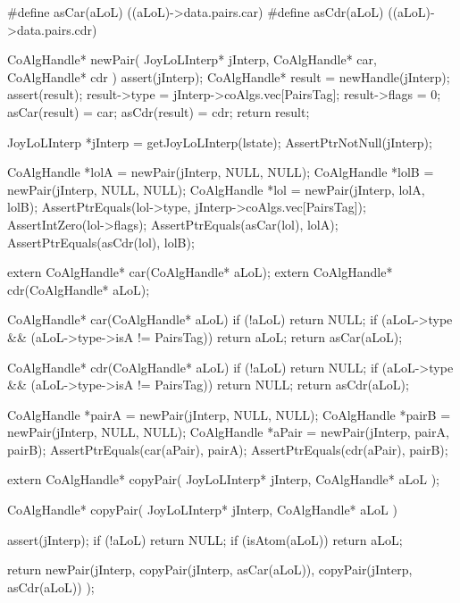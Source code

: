 #define asCar(aLoL) ((aLoL)->data.pairs.car)
#define asCdr(aLoL) ((aLoL)->data.pairs.cdr)
\stopCHeader

\startCCode
CoAlgHandle* newPair(
  JoyLoLInterp* jInterp,
  CoAlgHandle* car,
  CoAlgHandle* cdr
) {
  assert(jInterp);
  CoAlgHandle* result = newHandle(jInterp);
  assert(result);
  result->type        = jInterp->coAlgs.vec[PairsTag];
  result->flags       = 0;
  asCar(result)       = car;
  asCdr(result)       = cdr;
  return result;
}
\stopCCode


\startCTest
  JoyLoLInterp *jInterp = getJoyLoLInterp(lstate);
  AssertPtrNotNull(jInterp);
  
  CoAlgHandle *lolA = newPair(jInterp, NULL, NULL);
  CoAlgHandle *lolB = newPair(jInterp, NULL, NULL);
  CoAlgHandle *lol  = newPair(jInterp, lolA, lolB);
  AssertPtrEquals(lol->type, jInterp->coAlgs.vec[PairsTag]);
  AssertIntZero(lol->flags);
  AssertPtrEquals(asCar(lol), lolA);
  AssertPtrEquals(asCdr(lol), lolB);  
\stopCTest
\stopTestCase
\stopTestSuite


\startCHeader
extern CoAlgHandle* car(CoAlgHandle* aLoL);
extern CoAlgHandle* cdr(CoAlgHandle* aLoL);
\stopCHeader

\startCCode
CoAlgHandle* car(CoAlgHandle* aLoL) {
  if (!aLoL) return NULL;
  if (aLoL->type && (aLoL->type->isA != PairsTag)) return aLoL;
  return asCar(aLoL);
}

CoAlgHandle* cdr(CoAlgHandle* aLoL) {
  if (!aLoL) return NULL;
  if (aLoL->type && (aLoL->type->isA != PairsTag)) return NULL;
  return asCdr(aLoL);
}
\stopCCode


\startCTest
  CoAlgHandle *pairA = newPair(jInterp, NULL, NULL);
  CoAlgHandle *pairB = newPair(jInterp, NULL, NULL);
  CoAlgHandle *aPair = newPair(jInterp, pairA, pairB);
  AssertPtrEquals(car(aPair), pairA);
  AssertPtrEquals(cdr(aPair), pairB);
\stopCTest
\stopTestCase
\stopTestSuite

\startTestSuite[copyPair]

\startCHeader
extern CoAlgHandle* copyPair(
  JoyLoLInterp* jInterp,
  CoAlgHandle* aLoL
);
\stopCHeader

\startCCode
CoAlgHandle* copyPair(
  JoyLoLInterp* jInterp,
  CoAlgHandle* aLoL
) {
  assert(jInterp);
  if (!aLoL) return NULL;
  if (isAtom(aLoL)) return aLoL;

  return newPair(jInterp,
                 copyPair(jInterp, asCar(aLoL)),
                 copyPair(jInterp, asCdr(aLoL))
                 );
}
\stopCCode

